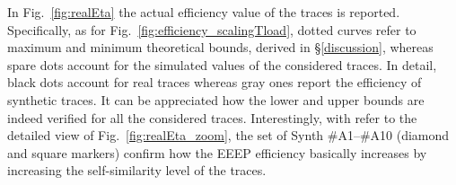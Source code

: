 \documentclass[journal,10pt,twoside,final]{IEEEtran}
\begin{document}
In Fig.~\ref{fig:realEta} the actual efficiency value  of the traces is reported. Specifically, as for Fig.~\ref{fig:efficiency_scalingTload}, dotted curves refer to maximum and minimum theoretical bounds, derived in \S\ref{discussion}, whereas spare dots account for the simulated   values of the considered traces. In detail, black dots account for real traces whereas gray ones report the efficiency of synthetic traces. It can be appreciated how the lower and upper bounds are indeed verified for all the considered traces. Interestingly, with refer to the detailed view of Fig.~\ref{fig:realEta_zoom}, the set of Synth \#A1--\#A10 (diamond and square markers) confirm how the EEEP efficiency basically increases by increasing the self-similarity level of the traces. 
\begin{figure*}[ht!]
\centering
{}
\hspace{1cm}
\vspace{-0.0cm}
\caption{Efficiency behavior for real and synthetic traces. Curves account for the theoretical limits, whereas dots refer to single traces.}
\label{fig:realEta}
\end{figure*}
\end{document}
